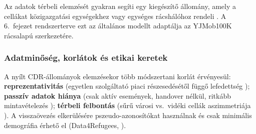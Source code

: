 Az adatok térbeli elemzését gyakran segíti egy kiegészítő állomány, amely a cellákat közigazgatási egységekhez vagy egységes rácshálóhoz rendeli \cite{rhoads2020measuring}. A 6.\ fejezet rendszerterve ezt az általános modellt adaptálja az YJMob100K rácsalapú szerkezetére.

\subsubsection{Adatminőség, korlátok és etikai keretek}

A nyílt CDR-állományok elemzésekor több módszertani korlát érvényesül: \textbf{reprezentativitás} (egyetlen szolgáltató piaci részesedésétől függő lefedettség \cite{pinter2022awakening}); \textbf{passzív adatok hiánya} (csak aktív események, handover nélkül, ritkább mintavételezés \cite{pinter2022awakening}); \textbf{térbeli felbontás} (sűrű városi vs.\ vidéki cellák aszimmetriája \cite{gonzalez2008understanding}). A visszaövezés elkerülésére pszeudo-azonosítókat használnak és csak minimális demográfia érhető el (Data4Refugees, \cite{zhang2019connected}).

